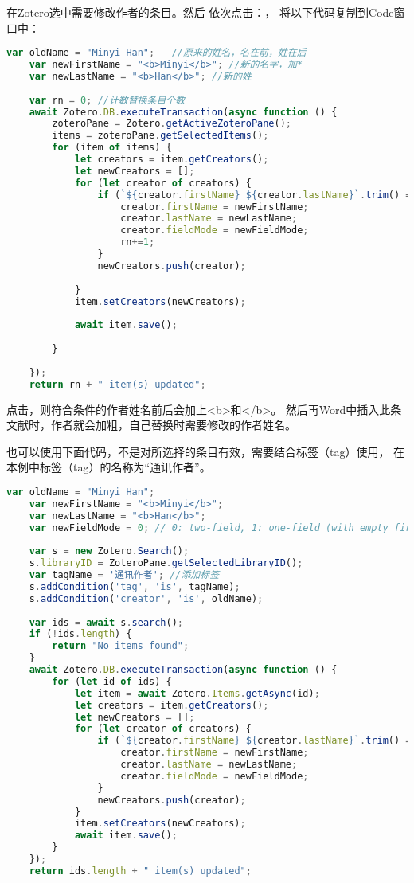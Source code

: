 \documentclass[theorem=false,mathfont=none,openany,sub3section]{easybook}
\begin{document}
{在Zotero选中需要修改作者的条目。然后
依次点击：，
将以下代码复制到Code窗口中：

\begin{lstlisting}[language=JavaScript]
	var oldName = "Minyi Han";   //原来的姓名，名在前，姓在后
	var newFirstName = "<b>Minyi</b>"; //新的名字，加*
	var newLastName = "<b>Han</b>"; //新的姓
	
	var rn = 0; //计数替换条目个数
	await Zotero.DB.executeTransaction(async function () {
		zoteroPane = Zotero.getActiveZoteroPane();
		items = zoteroPane.getSelectedItems();
		for (item of items) {
			let creators = item.getCreators();
			let newCreators = [];
			for (let creator of creators) {
				if (`${creator.firstName} ${creator.lastName}`.trim() == oldName) {
					creator.firstName = newFirstName;
					creator.lastName = newLastName;
					creator.fieldMode = newFieldMode;
					rn+=1;
				}
				newCreators.push(creator);
				
			}
			item.setCreators(newCreators);
			
			await item.save();
			
		}
		
	}); 
	return rn + " item(s) updated";
\end{lstlisting}
点击，则符合条件的作者姓名前后会加上<b>和</b>。
然后再Word中插入此条文献时，作者就会加粗，自己替换时需要修改的作者姓名。

也可以使用下面代码，不是对所选择的条目有效，需要结合标签（tag）使用，
在本例中标签（tag）的名称为“通讯作者”。
\begin{lstlisting}[language=JavaScript]
	var oldName = "Minyi Han";
	var newFirstName = "<b>Minyi</b>";
	var newLastName = "<b>Han</b>";
	var newFieldMode = 0; // 0: two-field, 1: one-field (with empty first name)
	
	var s = new Zotero.Search();
	s.libraryID = ZoteroPane.getSelectedLibraryID();
	var tagName = '通讯作者'; //添加标签
	s.addCondition('tag', 'is', tagName);
	s.addCondition('creator', 'is', oldName);
	
	var ids = await s.search();
	if (!ids.length) {
		return "No items found";
	}
	await Zotero.DB.executeTransaction(async function () {
		for (let id of ids) {
			let item = await Zotero.Items.getAsync(id);
			let creators = item.getCreators();
			let newCreators = [];
			for (let creator of creators) {
				if (`${creator.firstName} ${creator.lastName}`.trim() == oldName) {
					creator.firstName = newFirstName;
					creator.lastName = newLastName;
					creator.fieldMode = newFieldMode;
				}
				newCreators.push(creator);
			}
			item.setCreators(newCreators);
			await item.save();
		}
	});
	return ids.length + " item(s) updated";
\end{lstlisting}


}
\end{document}
